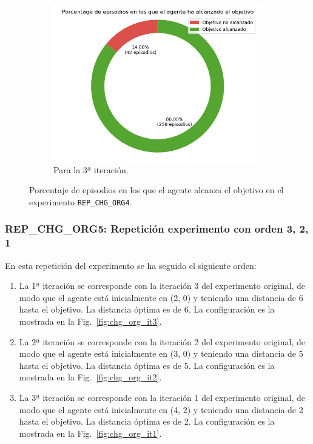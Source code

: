 \begin{figure}
\begin{subfigure}{.5\textwidth}
    \end{subfigure}
    \begin{subfigure}{.5\textwidth}
        \centering
        \includegraphics[scale=0.3]{cap5_experimentacion/images/CHANGE_ORIGIN-20_09-00_57-2, 0, 1_it3_porcentajeResuelto.png}
        \caption{Para la 3ª iteración.}
        \label{fig:CHANGE_ORIGIN-20_09-00_57-2, 0, 1_it3_porcentajeResuelto}
    \end{subfigure}%
    \caption{Porcentaje de episodios en los que el agente alcanza el objetivo en el experimento \texttt{REP\_CHG\_ORG4}.}
    \label{fig:CHANGE_ORIGIN-20_09-00_57-2, 0, 1_porcentajeResuelto}
\end{figure}

\subsubsection{REP\_CHG\_ORG5: Repetición experimento con orden 3, 2, 1} \label{REP_CHG_ORG5}

En esta repetición del experimento se ha seguido el siguiente orden: 
\begin{enumerate}
    \item La 1ª iteración se corresponde con la iteración 3 del experimento original, de modo que el agente está inicialmente en (2, 0) y teniendo una distancia de 6 hasta el objetivo. La distancia óptima es de 6. La configuración es la mostrada en la Fig.~\ref{fig:chg_org_it3}.
    \item La 2ª iteración se corresponde con la iteración 2 del experimento original, de modo que el agente está inicialmente en (3, 0) y teniendo una distancia de 5 hasta el objetivo. La distancia óptima es de 5. La configuración es la mostrada en la Fig.~\ref{fig:chg_org_it2}.
    \item La 3ª iteración se corresponde con la iteración 1 del experimento original, de modo que el agente está inicialmente en (4, 2) y teniendo una distancia de 2 hasta el objetivo. La distancia óptima es de 2. La configuración es la mostrada en la Fig.~\ref{fig:chg_org_it1}.
\end{enumerate}
 
